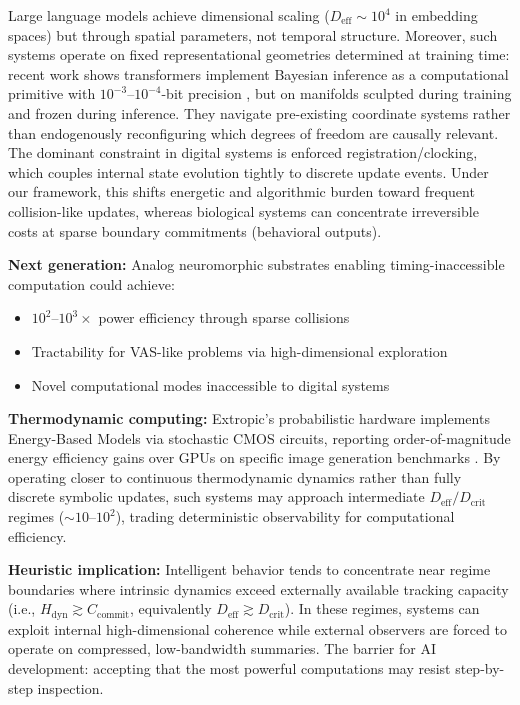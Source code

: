 \documentclass[12pt]{article}
\begin{document}
Large language models achieve dimensional scaling ($D_{\text{eff}} \sim 10^4$ in embedding spaces) but through spatial parameters, not temporal structure. Moreover, such systems operate on fixed representational geometries determined at training time: recent work shows transformers implement Bayesian inference as a computational primitive with $10^{-3}$--$10^{-4}$-bit precision \cite{aggarwal2025bayesian}, but on manifolds sculpted during training and frozen during inference. They navigate pre-existing coordinate systems rather than endogenously reconfiguring which degrees of freedom are causally relevant. The dominant constraint in digital systems is enforced registration/clocking, which couples internal state evolution tightly to discrete update events. Under our framework, this shifts energetic and algorithmic burden toward frequent collision-like updates, whereas biological systems can concentrate irreversible costs at sparse boundary commitments (behavioral outputs).

\textbf{Next generation:} Analog neuromorphic substrates enabling timing-inaccessible computation could achieve:
\begin{itemize}
\item $10^{2}$--$10^{3}\times$ power efficiency through sparse collisions
\item Tractability for VAS-like problems via high-dimensional exploration
\item Novel computational modes inaccessible to digital systems
\end{itemize}

\textbf{Thermodynamic computing:} Extropic's probabilistic hardware implements Energy-Based Models via stochastic CMOS circuits, reporting order-of-magnitude energy efficiency gains over GPUs on specific image generation benchmarks \cite{extropic2025}. By operating closer to continuous thermodynamic dynamics rather than fully discrete symbolic updates, such systems may approach intermediate $D_{\text{eff}}/D_{\text{crit}}$ regimes ($\sim 10$--$10^2$), trading deterministic observability for computational efficiency.

\textbf{Heuristic implication:} Intelligent behavior tends to concentrate near regime boundaries where intrinsic dynamics exceed externally available tracking capacity (i.e., $H_{\text{dyn}} \gtrsim C_{\text{commit}}$, equivalently $D_{\text{eff}} \gtrsim D_{\text{crit}}$). In these regimes, systems can exploit internal high-dimensional coherence while external observers are forced to operate on compressed, low-bandwidth summaries. The barrier for AI development: accepting that the most powerful computations may resist step-by-step inspection.
\end{document}

